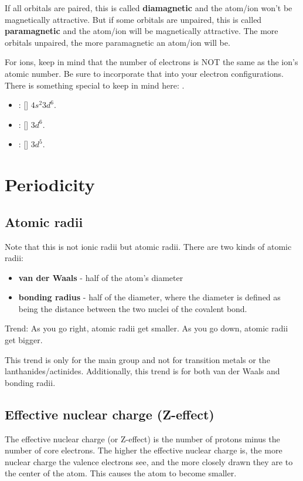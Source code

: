 \documentclass[letterpaper, 12pt]{article}
\begin{document}
	If all orbitals are paired, this is called \textbf{diamagnetic} and the atom/ion won't be magnetically attractive. But if some orbitals are unpaired, this is called \textbf{paramagnetic} and the atom/ion will be magnetically attractive. The more orbitals unpaired, the more paramagnetic an atom/ion will be.

	For ions, keep in mind that the number of electrons is NOT the same as the ion's atomic number. Be sure to incorporate that into your electron configurations. There is something special to keep in mind here: .

	\begin{itemize}
		\item {}: [] $4s^2 3d^6$.
		\item {}: [] $3d^6$.
		\item {}: [] $3d^5$.
	\end{itemize}

\section{Periodicity}
	\subsection{Atomic radii}
	Note that this is not ionic radii but atomic radii. There are two kinds of atomic radii:
	\begin{itemize}
		\item \textbf{van der Waals} - half of the atom's diameter
		\item \textbf{bonding radius} - half of the diameter, where the diameter is defined as being the distance between the two nuclei of the covalent bond.
	\end{itemize}

	Trend: As you go right, atomic radii get smaller. As you go down, atomic radii get bigger.

	This trend is only for the main group and not for transition metals or the lanthanides/actinides. Additionally, this trend is for both van der Waals and bonding radii.

	\subsection{Effective nuclear charge (Z-effect)}
	The effective nuclear charge (or Z-effect) is the number of protons minus the number of core electrons. The higher the effective nuclear charge is, the more nuclear charge the valence electrons see, and the more closely drawn they are to the center of the atom. This causes the atom to become smaller.
\end{document}

